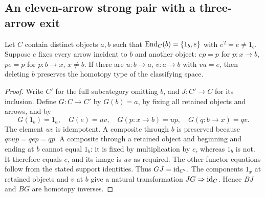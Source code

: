 \subsection{An eleven-arrow strong pair with a three-arrow exit}

\begin{lemma}
\label{C:retract-supported-vertex}
Let $C$ contain distinct objects $a,b$ such that
$\operatorname{End}_C(b)=\{1_b,e\}$ with $e^2=e\ne1_b$.
Suppose $e$ fixes every arrow incident to $b$ and another object:
$ep=p$ for $p:x\to b$, $pe=p$ for $p:b\to x$, $x\ne b$.
If there are $u:b\to a$, $v:a\to b$ with $vu=e$, then deleting
$b$ preserves the homotopy type of the classifying space.
\end{lemma}
\begin{proof}
Write $C'$ for the full subcategory omitting $b$, and $J:C'\to C$
for its inclusion.  Define $G:C\to C'$ by $G(b)=a$, by fixing
all retained objects and arrows, and by
\[
 G(1_b)=1_a,\quad G(e)=uv,\quad
 G(p:x\to b)=up,\quad G(q:b\to x)=qv.
\]
The element $uv$ is idempotent.  A composite through $b$ is
preserved because $qvu p=qep=qp$.  A composite through a retained
object and beginning and ending at $b$ cannot equal $1_b$:
it is fixed by multiplication by $e$, whereas $1_b$ is not.
It therefore equals $e$, and its image is $uv$ as required.
The other functor equations follow from the stated support
identities.  Thus $GJ=\mathrm {id}_{C'}$.  The components $1_x$ at retained
objects and $v$ at $b$ give a natural transformation
$JG\Rightarrow\mathrm {id}_C$.  Hence $BJ$ and $BG$ are homotopy inverses.
\end{proof}


